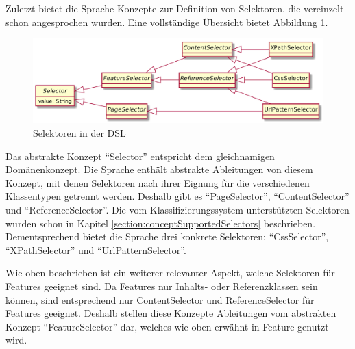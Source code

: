     Zuletzt bietet die Sprache Konzepte zur Definition von Selektoren,
    die vereinzelt schon angesprochen wurden.
    Eine vollständige Übersicht bietet Abbildung \ref{image:dslSelectors}.

    \begin{figure}[htb]
        \centering
        \includegraphics[scale=\imageScalingFactor]{../resources/dsl/selectors.png}
        \caption{Selektoren in der DSL}
        \label{image:dslSelectors}
    \end{figure}

    Das abstrakte Konzept "`Selector"' entspricht dem gleichnamigen Domänenkonzept.
    Die Sprache enthält abstrakte Ableitungen von diesem Konzept,
    mit denen Selektoren nach ihrer Eignung für die verschiedenen Klassentypen
    getrennt werden. Deshalb gibt es "`PageSelector"', "`ContentSelector"' und "`ReferenceSelector"'.
    Die vom Klassifizierungssystem unterstützten Selektoren wurden schon in Kapitel
    \ref{section:conceptSupportedSelectors} beschrieben.
    Dementsprechend bietet die Sprache drei konkrete Selektoren:
    "`CssSelector"', "`XPathSelector"' und "`UrlPatternSelector"'.

    Wie oben beschrieben ist ein weiterer relevanter Aspekt, welche Selektoren
    für Features geeignet sind.
    Da Features nur Inhalts- oder Referenzklassen sein können,
    sind entsprechend nur ContentSelector und ReferenceSelector für Features geeignet.
    Deshalb stellen diese Konzepte Ableitungen vom abstrakten Konzept "`FeatureSelector"' dar,
    welches wie oben erwähnt in Feature genutzt wird.